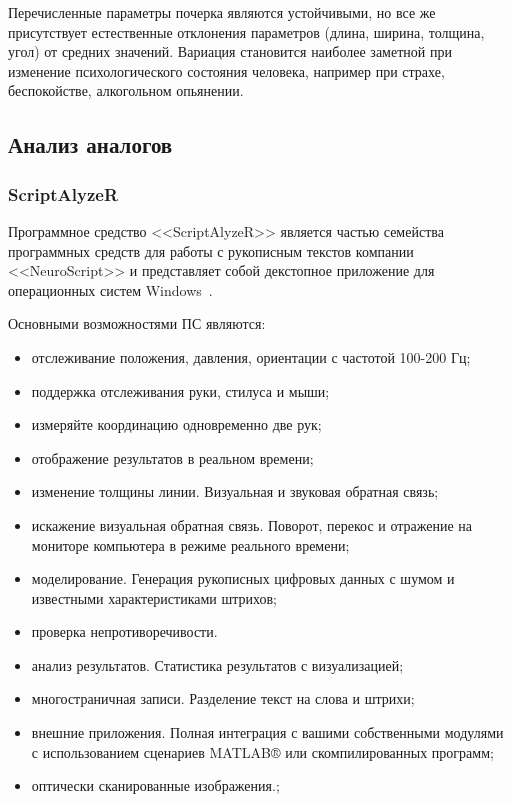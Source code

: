 Перечисленные параметры почерка являются устойчивыми, но все же присутствует естественные отклонения параметров (длина, ширина, толщина, угол) от средних значений. Вариация становится наиболее заметной при изменение психологического состояния человека, например при страхе, беспокойстве, алкогольном опьянении.

\subsection{Анализ аналогов}
\label{sub:domain:analogs}

\subsubsection{ScriptAlyzeR}
\label{sub:domain:analogs:neuro_script} 

Программное средство <<ScriptAlyzeR>> является частью семейства программных средств для работы с рукописным текстов компании <<NeuroScript>> и представляет собой декстопное приложение для операционных систем Windows~\cite{analogs_scriptAlyzer}.

Основными возможностями ПС являются:
\begin{itemize}
  \item отслеживание положения, давления, ориентации с частотой 100-200 Гц;
	\item поддержка отслеживания руки, стилуса и мыши;
	\item измеряйте координацию одновременно две рук;
	\item отображение результатов в реальном времени;
	\item изменение толщины линии. Визуальная и звуковая обратная связь;
	\item искажение визуальная обратная связь. Поворот, перекос и отражение на мониторе компьютера в режиме реального времени;
	\item моделирование. Генерация рукописных цифровых данных с шумом и известными характеристиками штрихов;
	\item проверка непротиворечивости.
	\item анализ результатов. Статистика результатов с визуализацией;
	\item многостраничная записи. Разделение текст на слова и штрихи;
	\item внешние приложения. Полная интеграция с вашими собственными модулями с использованием сценариев MATLAB® или скомпилированных программ;
	\item оптически сканированные изображения.;
\end{itemize}

